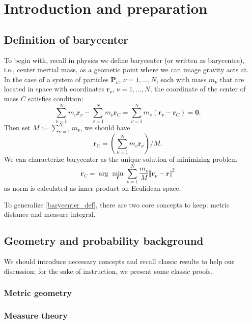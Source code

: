 \chapter{Introduction and preparation}
\section{Definition of barycenter}
To begin with, recall in physics we define barycenter (or written as barycentre), i.e.,  center inertial mass, as a geometic point where we can image gravity acts at. In the case of a system of particles $\boldsymbol{P}_\nu$, $\nu = 1, \ldots , N$, each with mass $m_\nu$ that are located in space with coordinates $\boldsymbol{r}_\nu$, $\nu = 1, \ldots , N$, the coordinate of the center of mass $C$ satisfies condition:
\[
	\sum _{\nu=1}^{N} m_{\nu}\boldsymbol {r}_{\nu} -	\sum _{\nu=1}^{N}m_{\nu}\boldsymbol {r}_C = \sum _{\nu=1}^{N}m_{\nu}(\boldsymbol {r} _{\nu}-\boldsymbol {r}_C )=\boldsymbol {0}.
\]
Then set \( M := \sum _ { \nu = 1 } ^ { N } m _ { \nu } \), we should have
\[
	\boldsymbol { r } _ { C } = \left( \sum _ { \nu = 1 } ^ { N } m _ { \nu } \boldsymbol { r } _ { \nu } \right) / M .
\]
We can characterize barycenter as the unique solution of minimizing problem
\begin{equation}
	\label{barycenter_def}
	\boldsymbol{r}_C = \operatorname{arg} \min_{\boldsymbol{r}} \sum_{\nu= 1}^N \frac{m_\nu}{M} \Vert \boldsymbol{r}_{\nu} - \boldsymbol{r}\Vert^2
\end{equation}
as norm is calculated as inner product on Eculidean space.

To generalize \ref{barycenter_def}, there are two core concepts to keep: metric distance and measure integral.

\section{Geometry and probability background}
We should introduce necessary concepts and recall classic results to help our discussion; for the sake of instruction, we present some classic proofs.
\subsection{Metric geometry}
\subsection{Measure theory}

